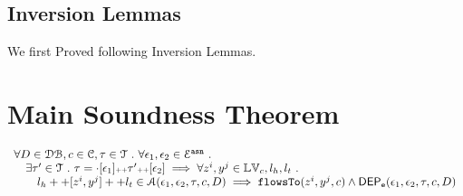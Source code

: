 \subsection{Inversion Lemmas}
We first Proved following Inversion Lemmas.

\clearpage
\section{Main Soundness Theorem}
\begin{thm}
\label{thm:alg_correct}
\[
  \begin{array}{l}
    \forall D \in \mathcal{DB} , c \in \mathcal{C}, \mathtt{\tau} \in \mathcal{T} ~.~ \forall \mathtt{\epsilon}_1, \mathtt{\epsilon}_2 \in \mathcal{E}^{\mathtt{{asn}}} ~.~
    \\ \quad 
     \exists \mathtt{\tau}' \in \mathcal{T} ~.~ \mathtt{\tau} = \cdot [\mathtt{\epsilon}_1] {\scriptscriptstyle ++} \mathtt{\tau}' {\scriptscriptstyle ++} [\mathtt{\epsilon}_2]
     \implies    \forall  z^i, y^j \in \mathbb{LV}_c, l_h, l_t ~.~ 
    \\ \qquad 
     l_h ++ [z^i, y^j] ++ l_t \in \mathcal{A}(\mathtt{\epsilon}_1, \mathtt{\epsilon}_2, \mathtt{\tau}, c, D)
     \implies \mathtt{flowsTo}(z^i, y^j, c) \land \mathsf{DEP_{\mathtt{e}}}(\mathtt{\epsilon}_1, \mathtt{\epsilon}_2, \mathtt{\tau}, {c}, D) 
  \end{array}
\]
\end{thm}

